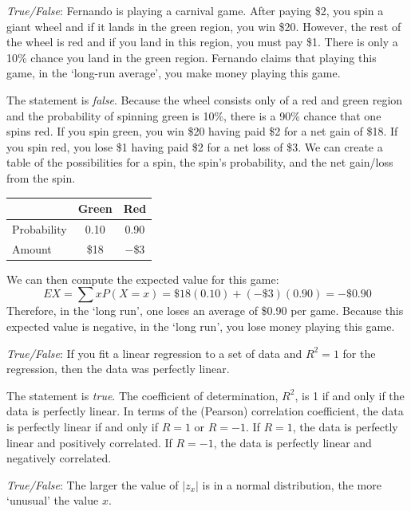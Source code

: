 \documentclass[11pt,letterpaper]{article}
\begin{document}
\quizsol \textit{True/False}: Fernando is playing a carnival game. After paying \$2, you spin a giant wheel and if it lands in the green region, you win \$20. However, the rest of the wheel is red and if you land in this region, you must pay \$1. There is only a 10\% chance you land in the green region. Fernando claims that playing this game, in the `long-run average', you make money playing this game. \pspace

\sol The statement is \textit{false}. Because the wheel consists only of a red and green region and the probability of spinning green is 10\%, there is a 90\% chance that one spins red. If you spin green, you win \$20 having paid \$2 for a net gain of \$18. If you spin red, you lose \$1 having paid \$2 for a net loss of \$3. We can create a table of the possibilities for a spin, the spin's probability, and the net gain/loss from the spin. 
	\begin{table}[!ht]
	\centering
	\begin{tabular}{|l|c|c|} \hline
	& Green & Red \\ \hline
	Probability & 0.10 & 0.90 \\ \hline
	Amount & \$18 & $-$\$3 \\ \hline
	\end{tabular}
	\end{table}
We can then compute the expected value for this game:
	\[
	EX= \sum x P(X= x)= \$18(0.10) + (-\$3)(0.90)= -\$0.90
	\]
Therefore, in the `long run', one loses an average of \$0.90 per game. Because this expected value is negative, in the `long run', you lose money playing this game. 



\newpage



\quizsol \textit{True/False}: If you fit a linear regression to a set of data and $R^2= 1$ for the regression, then the data was perfectly linear. \pspace

\sol The statement is \textit{true}. The coefficient of determination, $R^2$, is 1 if and only if the data is perfectly linear. In terms of the (Pearson) correlation coefficient, the data is perfectly linear if and only if $R= 1$ or $R= -1$. If $R= 1$, the data is perfectly linear and positively correlated. If $R= -1$, the data is perfectly linear and negatively correlated. \pvspace{1.3cm}



\quizsol \textit{True/False}: The larger the value of $|z_x|$ is in a normal distribution, the more `unusual' the value $x$. \pspace
\end{document}

